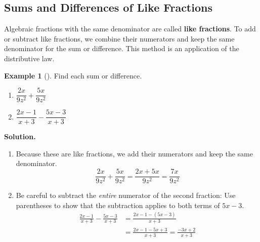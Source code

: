 \documentclass[10pt,]{book}
\newcommand{\terminology}[1]{\textbf{#1}}
\theoremstyle{plain}
\theoremstyle{definition}
\theoremstyle{definition}
\newtheorem{example}[theorem]{Example}
\theoremstyle{definition}
\numberwithin{equation}{part}
\newcommand{\amp}{&}
\begin{document}
\subsection[{Sums and Differences of Like Fractions}]{Sums and Differences of Like Fractions}\label{subsection-37}
Algebraic fractions with the same denominator are called \terminology{like fractions}. To add or subtract like fractions, we combine their numerators and keep the same denominator for the sum or difference. This method is an application of the distributive law.%
\begin{example}[]\label{example-61}
Find each sum or difference. \leavevmode%
\begin{enumerate}[label=*\alph**]
\item\hypertarget{li-303}{}\(\dfrac{2x}{9z^2}+\dfrac{5x}{9z^2}\)%
\item\hypertarget{li-304}{}\(\dfrac{2x-1}{x+3}-\dfrac{5x-3}{x+3}\)%
\end{enumerate}
%
\par\medskip\noindent%
\textbf{Solution.}\quad \leavevmode%
\begin{enumerate}[label=*\alph**]
\item\hypertarget{li-305}{}Because these are like fractions, we add their numerators and keep the same denominator.%
\begin{equation*}
\frac{2x}{9z^2}+\frac{5x}{9z^2}=\frac{2x+5x}{9z^2}=\frac{7x}{9z^2}
\end{equation*}
%
\item\hypertarget{li-306}{}Be careful to subtract the \emph{entire} numerator of the second fraction: Use parentheses to show that the subtraction applies to both terms of \(5x − 3\).%
\begin{align*}
\frac{2x-1}{x+3}-\frac{5x-3}{x+3}\amp = \frac{2x-1-(5x-3)}{x+3}
\\
\amp =\frac{2x-1-5x+3}{x+3}=\frac{-3x+2}{x+3}
\end{align*}
%
\end{enumerate}
%
\end{example}
\typeout{************************************************}
\typeout{************************************************}
\end{document}
